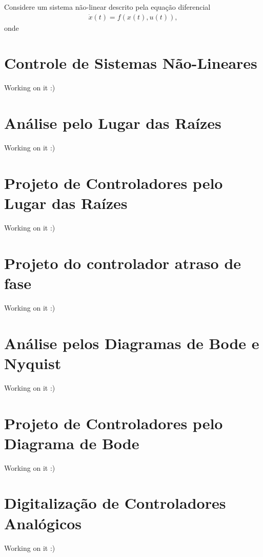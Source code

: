 \documentclass[
]{book}
\begin{document}
Considere um sistema não-linear descrito pela equação diferencial
\begin{align}
\dot{x}(t) = f(x(t),u(t)), \label{eq:eq62}
\end{align}
onde

\hypertarget{controle-de-sistemas-nuxe3o-lineares}{%
\chapter{Controle de Sistemas Não-Lineares}\label{controle-de-sistemas-nuxe3o-lineares}}

Working on it :)

\hypertarget{anuxe1lise-pelo-lugar-das-rauxedzes}{%
\chapter{Análise pelo Lugar das Raízes}\label{anuxe1lise-pelo-lugar-das-rauxedzes}}

Working on it :)

\hypertarget{projeto-de-controladores-pelo-lugar-das-rauxedzes}{%
\chapter{Projeto de Controladores pelo Lugar das Raízes}\label{projeto-de-controladores-pelo-lugar-das-rauxedzes}}

Working on it :)

\hypertarget{projeto-do-controlador-atraso-de-fase}{%
\chapter{Projeto do controlador atraso de fase}\label{projeto-do-controlador-atraso-de-fase}}

Working on it :)

\hypertarget{anuxe1lise-pelos-diagramas-de-bode-e-nyquist}{%
\chapter{Análise pelos Diagramas de Bode e Nyquist}\label{anuxe1lise-pelos-diagramas-de-bode-e-nyquist}}

Working on it :)

\hypertarget{projeto-de-controladores-pelo-diagrama-de-bode}{%
\chapter{Projeto de Controladores pelo Diagrama de Bode}\label{projeto-de-controladores-pelo-diagrama-de-bode}}

Working on it :)

\hypertarget{digitalizauxe7uxe3o-de-controladores-analuxf3gicos}{%
\chapter{Digitalização de Controladores Analógicos}\label{digitalizauxe7uxe3o-de-controladores-analuxf3gicos}}

Working on it :)

  
\end{document}
